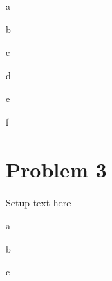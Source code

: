 \documentclass{article}
\begin{document}
\begin{problem}{a}
\end{problem}
\begin{solution}
\end{solution}

\begin{problem}{b}
\end{problem}
\begin{solution}
\end{solution}

\begin{problem}{c}
\end{problem}
\begin{solution}
\end{solution}

\begin{problem}{d}
\end{problem}
\begin{solution}
\end{solution}

\begin{problem}{e}
\end{problem}
\begin{solution}
\end{solution}

\begin{problem}{f}
\end{problem}
\begin{solution}
\end{solution}

\newpage
\section*{Problem 3}
Setup text here

\begin{problem}{a}
\end{problem}
\begin{solution}
\end{solution}

\begin{problem}{b}
\end{problem}
\begin{solution}
\end{solution}

\begin{problem}{c}
\end{problem}
\begin{solution}
\end{solution}
\end{document}
